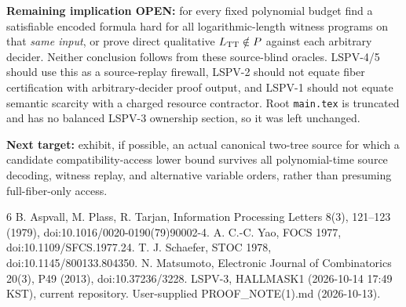 \documentclass[11pt]{article}
\begin{document}
\noindent\textbf{Remaining implication OPEN:} for every fixed polynomial budget find a satisfiable encoded formula hard for all logarithmic-length witness programs on that \emph{same input}, or prove direct qualitative $L_{\rm TT}\notin P$ against each arbitrary decider. Neither conclusion follows from these source-blind oracles. LSPV-4/5 should use this as a source-replay firewall, LSPV-2 should not equate fiber certification with arbitrary-decider proof output, and LSPV-1 should not equate semantic scarcity with a charged resource contractor. Root \texttt{main.tex} is truncated and has no balanced LSPV-3 ownership section, so it was left unchanged.

\noindent\textbf{Next target:} exhibit, if possible, an actual canonical two-tree source for which a candidate compatibility-access lower bound survives all polynomial-time source decoding, witness replay, and alternative variable orders, rather than presuming full-fiber-only access.

\begin{thebibliography}{6}
 B. Aspvall, M. Plass, R. Tarjan, Information Processing Letters 8(3), 121--123 (1979), doi:10.1016/0020-0190(79)90002-4.
 A. C.-C. Yao, FOCS 1977, doi:10.1109/SFCS.1977.24.
 T. J. Schaefer, STOC 1978, doi:10.1145/800133.804350.
 N. Matsumoto, Electronic Journal of Combinatorics 20(3), P49 (2013), doi:10.37236/3228.
 LSPV-3, HALLMASK1 (2026-10-14 17:49 KST), current repository.
 User-supplied PROOF_NOTE(1).md (2026-10-13).
\end{thebibliography}
\end{document}
